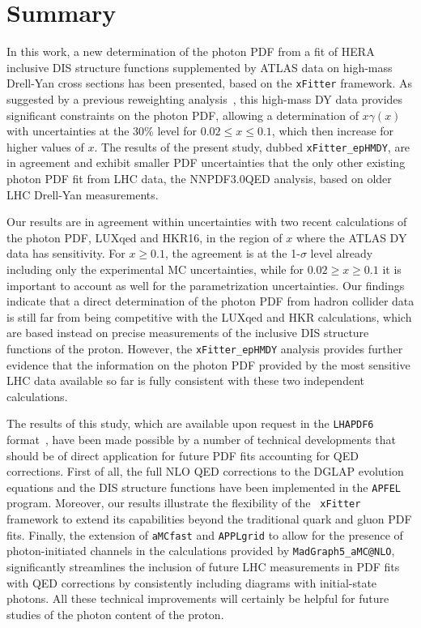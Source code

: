 \section{Summary}
\label{sec:conclusions}

In this work, a new determination of the photon PDF from
a fit of HERA inclusive DIS structure functions supplemented
by ATLAS data on high-mass Drell-Yan cross
sections has been presented, based on the {\tt xFitter} framework.
%
As suggested by a previous reweighting analysis~\cite{Aad:2016zzw}, this
high-mass DY data provides significant constraints on the photon PDF,
allowing a determination of $x\gamma(x)$ with uncertainties at the
30\% level for $0.02 \le x \le 0.1$, which then increase for higher
values of $x$.
%
The results of the present study, dubbed {\tt xFitter\_epHMDY}, are in agreement
and exhibit smaller PDF uncertainties that the only
other existing photon PDF fit from LHC data, the 
NNPDF3.0QED analysis, based on older LHC Drell-Yan measurements.

Our results are in agreement within uncertainties with two recent
calculations of the photon PDF, LUXqed and HKR16, in the region of $x$
where the ATLAS DY data has sensitivity.
%
For $x\ge 0.1$, the agreement is at the 1-$\sigma$ level already including
only the experimental MC uncertainties, while for $0.02 \ge x \ge 0.1$ it is
important to account as well for the parametrization uncertainties.
%
Our findings indicate that a direct determination of the
photon PDF from hadron collider data
is still far from being competitive with the LUXqed and HKR
calculations, which are based instead on precise measurements of the inclusive DIS
structure functions of the proton.
%
However, the {\tt xFitter\_epHMDY} analysis provides further evidence that the information
on the photon PDF provided by the most sensitive LHC data available so far
is fully consistent with these two independent calculations.

The results of this study, which
 are available upon
 request in the {\tt LHAPDF6} format~\cite{Buckley:2014ana},
 have been made possible by a number of
technical developments that should be of direct application for future
PDF fits accounting for QED corrections.
%
First of all, the full NLO
QED corrections to the DGLAP evolution equations and the DIS
structure functions have been implemented in the  {\tt APFEL} program.
%
Moreover, our results illustrate the flexibility of the {\tt
  xFitter} framework to extend its capabilities beyond the traditional
quark and gluon PDF fits.
%
Finally, the extension of {\tt aMCfast} and {\tt APPLgrid} to allow
for the presence of photon-initiated channels in the calculations
provided by {\tt MadGraph5\_aMC@NLO}, significantly streamlines the
inclusion of future LHC measurements in PDF fits with QED corrections by
consistently including diagrams with initial-state photons.
%
All these technical improvements will certainly be helpful for future
studies of the photon content of the proton.\\

